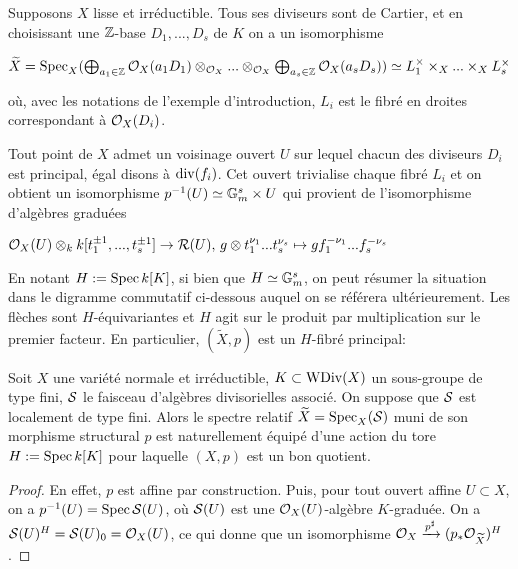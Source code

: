 \begin{rem}\label{lisseGoodQuotient}
Supposons $X$ lisse et irréductible. Tous ses diviseurs sont de Cartier, et en choisissant une $\mathbb{Z}$-base $D_1,...,D_s$ de $K$ on a un isomorphisme
\begin{center}
$\widetilde{X}=\operatorname{Spec}_X(\bigoplus_{a_1\in\mathbb{Z}}\mathcal{O}_X(a_1D_1)\otimes_{\mathcal{O}_X}...\otimes_{\mathcal{O}_X}\bigoplus_{a_s\in\mathbb{Z}}\mathcal{O}_X(a_sD_s))\simeq L_1^\times\times_X...\times_X L_s^\times$
\end{center}
où, avec les notations de l'exemple d'introduction, $L_i$ est le fibré en droites correspondant à $\mathcal{O}_X(D_i)$. 

Tout point de $X$ admet un voisinage ouvert $U$ sur lequel chacun des diviseurs $D_i$ est principal, égal disons à $\operatorname{div}(f_i)$. Cet ouvert trivialise chaque fibré $L_i$ et on obtient un isomorphisme $p^{-1}(U)\simeq \mathbb{G}_m^s\times U$ qui provient de l'isomorphisme d'algèbres graduées
\begin{center}
$\mathcal{O}_X(U)\otimes_k k[t_1^{\pm 1},...,t_s^{\pm 1}] \rightarrow \mathcal{R}(U),\, g\otimes t_1^{\nu_1}...t_s^{\nu_s}\mapsto gf_1^{-\nu_1}...f_s^{-\nu_s}$
\end{center}

En notant $H:=\operatorname{Spec} k[K]$, si bien que $H\simeq \mathbb{G}_m^s$, on peut résumer la situation dans le digramme commutatif ci-dessous auquel on se référera ultérieurement. Les flèches sont $H$-équivariantes et $H$ agit sur le produit par multiplication sur le premier facteur. En particulier, $(\widetilde{X},p)$ est un $H$-fibré principal:
\begin{center}
\end{center}
\end{rem}



\begin{cons}\label{specrelatifdivi}
Soit $X$ une variété normale et irréductible, $K\subset \operatorname{WDiv}(X)$ un sous-groupe de type fini, $\mathcal{S}$ le faisceau d'algèbres divisorielles associé. On suppose que $\mathcal{S}$ est localement de type fini. Alors le spectre relatif $\widetilde{X}=\operatorname{Spec}_X(\mathcal{S})$ muni de son morphisme structural $p$ est naturellement équipé d'une action du tore $H:=\operatorname{Spec} k[K]$ pour laquelle $(X,p)$ est un bon quotient.
\end{cons}
\begin{proof}
En effet, $p$ est affine par construction. Puis, pour tout ouvert affine $U\subset X$, on a $p^{-1}(U)=\operatorname{Spec} \mathcal{S}(U)$, où $\mathcal{S}(U)$ est une $\mathcal{O}_X(U)$-algèbre $K$-graduée. On a $\mathcal{S}(U)^H=\mathcal{S}(U)_0=\mathcal{O}_X(U)$, ce qui donne que un isomorphisme $\mathcal{O}_X \xrightarrow{p^\sharp} (p_*\mathcal{O}_{\widetilde{X}})^H$.
\end{proof}

